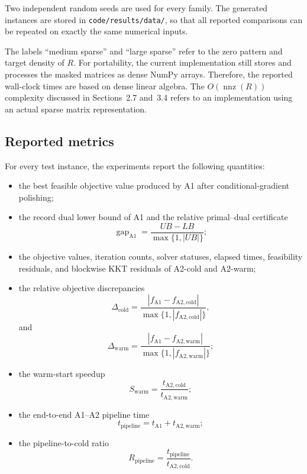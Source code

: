 \documentclass[12pt]{article}
\begin{document}
Two independent random seeds are used for every family. The generated
instances are stored in
\texttt{code/results/data/}, so that all reported comparisons can be
repeated on exactly the same numerical inputs.

The labels ``medium sparse'' and ``large sparse'' refer to the zero
pattern and target density of $R$. For portability, the current
implementation still stores and processes the masked matrices as dense
NumPy arrays. Therefore, the reported wall-clock times are based on
dense linear algebra. The
$O(\operatorname{nnz}(R))$ complexity discussed in
Sections~2.7 and~3.4 refers to an implementation using an actual sparse
matrix representation.

\subsection{Reported metrics}

For every test instance, the experiments report the following
quantities:

\begin{itemize}
    \item the best feasible objective value produced by A1 after
    conditional-gradient polishing;

    \item the record dual lower bound of A1 and the relative
    primal--dual certificate
    \[
    \operatorname{gap}_{\mathrm{A1}}
    =
    \frac{UB-LB}{\max\{1,|UB|\}};
    \]

    \item the objective values, iteration counts, solver statuses,
    elapsed times, feasibility residuals, and blockwise KKT residuals
    of A2-cold and A2-warm;

    \item the relative objective discrepancies
    \[
    \Delta_{\mathrm{cold}}
    =
    \frac{
    |f_{\mathrm{A1}}-f_{\mathrm{A2,cold}}|
    }{
    \max\{1,|f_{\mathrm{A2,cold}}|\}
    },
    \]
    and
    \[
    \Delta_{\mathrm{warm}}
    =
    \frac{
    |f_{\mathrm{A1}}-f_{\mathrm{A2,warm}}|
    }{
    \max\{1,|f_{\mathrm{A2,warm}}|\}
    };
    \]

    \item the warm-start speedup
    \begin{equation}
    S_{\mathrm{warm}}
    =
    \frac{
    t_{\mathrm{A2,cold}}
    }{
    t_{\mathrm{A2,warm}}
    };
    \label{eq:warm-speedup}
    \end{equation}

    \item the end-to-end A1--A2 pipeline time
    \[
    t_{\mathrm{pipeline}}
    =
    t_{\mathrm{A1}}+t_{\mathrm{A2,warm}};
    \]

    \item the pipeline-to-cold ratio
    \begin{equation}
    R_{\mathrm{pipeline}}
    =
    \frac{
    t_{\mathrm{pipeline}}
    }{
    t_{\mathrm{A2,cold}}
    }.
    \label{eq:pipeline-ratio}
    \end{equation}
\end{itemize}
\end{document}
